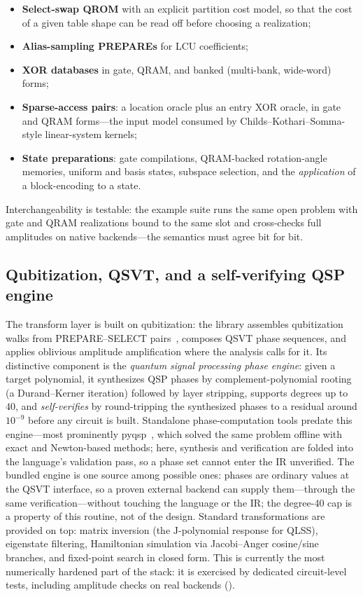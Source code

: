 \begin{itemize}
\item \textbf{Select-swap QROM} with an explicit partition cost model, so
  that the cost of a given table shape can be read off before choosing a
  realization;
\item \textbf{Alias-sampling PREPAREs} for LCU coefficients;
\item \textbf{XOR databases} in gate, QRAM, and banked (multi-bank,
  wide-word) forms;
\item \textbf{Sparse-access pairs}: a location oracle plus an entry XOR
  oracle, in gate and QRAM forms---the input model consumed by
  Childs--Kothari--Somma-style linear-system kernels;
\item \textbf{State preparations}: gate compilations, QRAM-backed
  rotation-angle memories, uniform and basis states, subspace selection, and
  the \emph{application} of a block-encoding to a state.
\end{itemize}

Interchangeability is testable: the example suite runs the same open problem
with gate and QRAM realizations bound to the same slot and cross-checks
full amplitudes on native backends---the semantics must agree bit for bit.

\subsection{Qubitization, QSVT, and a self-verifying QSP engine}
\label{sec:qsvt}

The transform layer is built on qubitization: the library assembles
qubitization walks from PREPARE--SELECT pairs~\cite{low2019qubitization,gilyen2019qsvt}, composes QSVT phase
sequences, and applies oblivious amplitude amplification where the analysis
calls for it.  Its distinctive component is the \emph{quantum signal
processing phase engine}: given a target polynomial, it synthesizes QSP
phases by complement-polynomial rooting (a Durand--Kerner iteration)
followed by layer stripping, supports degrees up to $40$, and
\emph{self-verifies} by round-tripping the synthesized phases to a residual
around $10^{-9}$ before any circuit is built.  Standalone phase-computation
tools predate this engine---most prominently
pyqsp~\cite{chuang2021pyqsp}, which solved the same problem offline with
exact and Newton-based methods; here, synthesis and verification are folded
into the language's validation pass, so a phase set cannot enter the IR
unverified.  The bundled engine is one source among possible ones: phases
are ordinary values at the QSVT interface, so a proven external backend
can supply them---through the same verification---without touching the
language or the IR; the degree-40 cap is a property of this routine, not
of the design.  Standard transformations are
provided on top: matrix inversion (the $\mathrm{J}$-polynomial response for
QLSS), eigenstate filtering, Hamiltonian simulation via Jacobi--Anger
cosine/sine branches, and fixed-point search in closed form.  This is
currently the most numerically hardened part of the stack: it is exercised
by dedicated circuit-level tests, including amplitude checks on real
backends ().

